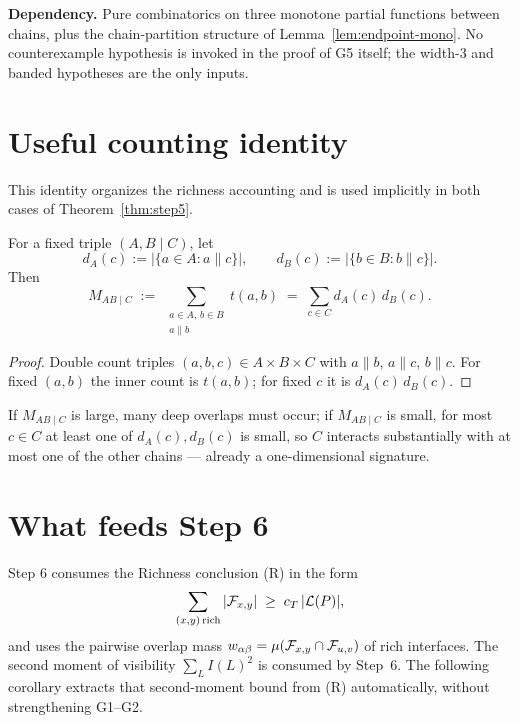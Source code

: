 \noindent\textbf{Dependency.} Pure combinatorics on three monotone partial
functions between chains, plus the chain-partition structure of
Lemma~\ref{lem:endpoint-mono}. No counterexample hypothesis is invoked in
the proof of G5 itself; the width-$3$ and banded hypotheses are the only
inputs.

\section{Useful counting identity}

This identity organizes the richness accounting and is used implicitly in both
cases of Theorem~\ref{thm:step5}.

\begin{proposition}\label{prop:counting}
For a fixed triple $(A, B \mid C)$, let
\[
d_A(c) := |\{a \in A : a \parallel c\}|,\qquad d_B(c) := |\{b \in B : b \parallel c\}|.
\]
Then
\[
M_{AB \mid C} \;:=\; \sum_{\substack{a \in A,\, b \in B\\ a \parallel b}} t(a, b)
\;=\; \sum_{c \in C} d_A(c)\, d_B(c).
\]
\end{proposition}

\begin{proof}
Double count triples $(a, b, c) \in A \times B \times C$ with $a \parallel b$,
$a \parallel c$, $b \parallel c$. For fixed $(a, b)$ the inner count is $t(a,b)$;
for fixed $c$ it is $d_A(c)\, d_B(c)$.
\end{proof}

\begin{remark}
If $M_{AB\mid C}$ is large, many deep overlaps must occur; if $M_{AB\mid C}$ is
small, for most $c \in C$ at least one of $d_A(c), d_B(c)$ is small, so $C$
interacts substantially with at most one of the other chains --- already a
one-dimensional signature.
\end{remark}

\section{What feeds Step 6}

Step 6 consumes the Richness conclusion (R) in the form
\[
\sum_{(x,y)\,\text{rich}} |\mathcal{F}_{x,y}| \;\ge\; c_T\,|\mathcal{L}(P)|,
\]
and uses the pairwise overlap mass $w_{\alpha\beta} = \mu(\mathcal{F}_{x,y} \cap \mathcal{F}_{u,v})$
of rich interfaces. The second moment of visibility $\sum_L I(L)^2$ is
consumed by Step~6. The following corollary extracts that second-moment
bound from (R) automatically, without strengthening G1--G2.

